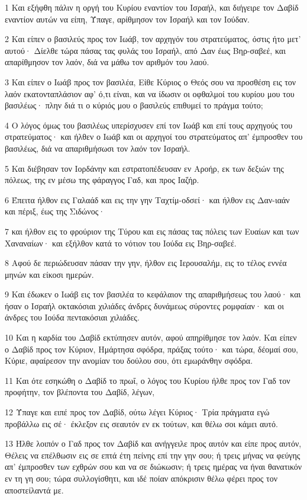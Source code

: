 \par 1 Και εξήφθη πάλιν η οργή του Κυρίου εναντίον του Ισραήλ, και διήγειρε τον Δαβίδ εναντίον αυτών να είπη, Ύπαγε, αρίθμησον τον Ισραήλ και τον Ιούδαν.
\par 2 Και είπεν ο βασιλεύς προς τον Ιωάβ, τον αρχηγόν του στρατεύματος, όστις ήτο μετ' αυτού· Δίελθε τώρα πάσας τας φυλάς του Ισραήλ, από Δαν έως Βηρ-σαβεέ, και απαρίθμησον τον λαόν, διά να μάθω τον αριθμόν του λαού.
\par 3 Και είπεν ο Ιωάβ προς τον βασιλέα, Είθε Κύριος ο Θεός σου να προσθέση εις τον λαόν εκατονταπλάσιον αφ' ό,τι είναι, και να ίδωσιν οι οφθαλμοί του κυρίου μου του βασιλέως· πλην διά τι ο κύριός μου ο βασιλεύς επιθυμεί το πράγμα τούτο;
\par 4 Ο λόγος όμως του βασιλέως υπερίσχυσεν επί τον Ιωάβ και επί τους αρχηγούς του στρατεύματος· και ήλθεν ο Ιωάβ και οι αρχηγοί του στρατεύματος απ' έμπροσθεν του βασιλέως, διά να απαριθμήσωσι τον λαόν τον Ισραήλ.
\par 5 Και διέβησαν τον Ιορδάνην και εστρατοπέδευσαν εν Αροήρ, εκ των δεξιών της πόλεως, της εν μέσω της φάραγγος Γαδ, και προς Ιαζήρ.
\par 6 Έπειτα ήλθον εις Γαλαάδ και εις την γην Ταχτίμ-οδσεί· και ήλθον εις Δαν-ιαάν και πέριξ, έως της Σιδώνος·
\par 7 και ήλθον εις το φρούριον της Τύρου και εις πάσας τας πόλεις των Ευαίων και των Χαναναίων· και εξήλθον κατά το νότιον του Ιούδα εις Βηρ-σαβεέ.
\par 8 Αφού δε περιώδευσαν πάσαν την γην, ήλθον εις Ιερουσαλήμ, εις το τέλος εννέα μηνών και είκοσι ημερών.
\par 9 Και έδωκεν ο Ιωάβ εις τον βασιλέα το κεφάλαιον της απαριθμήσεως του λαού· και ήσαν ο Ισραήλ οκτακόσιαι χιλιάδες άνδρες δυνάμεως σύροντες ρομφαίαν· και οι άνδρες του Ιούδα πεντακόσιαι χιλιάδες.
\par 10 Και η καρδία του Δαβίδ εκτύπησεν αυτόν, αφού απηρίθμησε τον λαόν. Και είπεν ο Δαβίδ προς τον Κύριον, Ημάρτησα σφόδρα, πράξας τούτο· και τώρα, δέομαί σου, Κύριε, αφαίρεσον την ανομίαν του δούλου σου, ότι εμωράνθην σφόδρα.
\par 11 Και ότε εσηκώθη ο Δαβίδ το πρωΐ, ο λόγος του Κυρίου ήλθε προς τον Γαδ τον προφήτην, τον βλέποντα του Δαβίδ, λέγων,
\par 12 Ύπαγε και ειπέ προς τον Δαβίδ, ούτω λέγει Κύριος· Τρία πράγματα εγώ προβάλλω εις σέ· έκλεξον εις σεαυτόν εν εκ τούτων, και θέλω σοι κάμει αυτό.
\par 13 Ήλθε λοιπόν ο Γαδ προς τον Δαβίδ και ανήγγειλε προς αυτόν και είπε προς αυτόν, Θέλεις να επέλθωσιν εις σε επτά έτη πείνης επί την γην σου; ή τρεις μήνας να φεύγης απ' έμπροσθεν των εχθρών σου και να σε διώκωσιν; ή τρεις ημέρας να ήναι θανατικόν εν τη γη σου; τώρα συλλογίσθητι, και ιδέ ποίαν απόκρισιν θέλω φέρει προς τον αποστείλαντά με.
